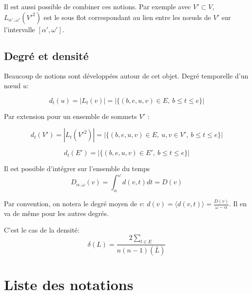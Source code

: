Il est aussi possible de combiner ces notions.
Par exemple avec $V' \subset V$, $L_{\alpha'..\omega'}(V'^2)$ est le sous flot correspondant au lien entre les n\oe uds de $V'$ sur l'intervalle $[\alpha', \omega']$.


\section{Degré et densité}
Beaucoup de notions sont développées autour de cet objet.
Degré temporelle d'un n\oe ud $u$:

\begin{equation}
d_t(u)= |L_t(v)| = |\{(b,e,u,v) \in E,\ b \leq t \leq e\}|
\end{equation}

Par extension pour un ensemble de sommets $V'$ :

\begin{equation}
d_t(V')= |L_{t}(V'^2)| = |\{(b,e,u,v) \in E,\ u,v \in V',\ b \leq t \leq e\}|
\end{equation}


\begin{equation}
d_t(E')= |\{(b,e,u,v) \in E',\ b \leq t \leq e\}|
\end{equation}

Il est possible d'intégrer sur l'ensemble du temps 
\begin{equation}
D_{\alpha..\omega}(v)= \int_{\alpha}^{\omega}d(v,t) dt=D(v)
\end{equation}

Par convention, on notera le degré moyen de $v$: $d(v)= \langle d(v,t) \rangle=\frac{D(v)}{\omega-\alpha}$.
Il en va de même pour les autres degrés.

C'est le cas de la densité:
\begin{equation}
\delta(L)= \frac{2\sum_{l \in E}}{n(n-1)(\bar{L})}
\end{equation}





\chapter*{Liste des notations}


